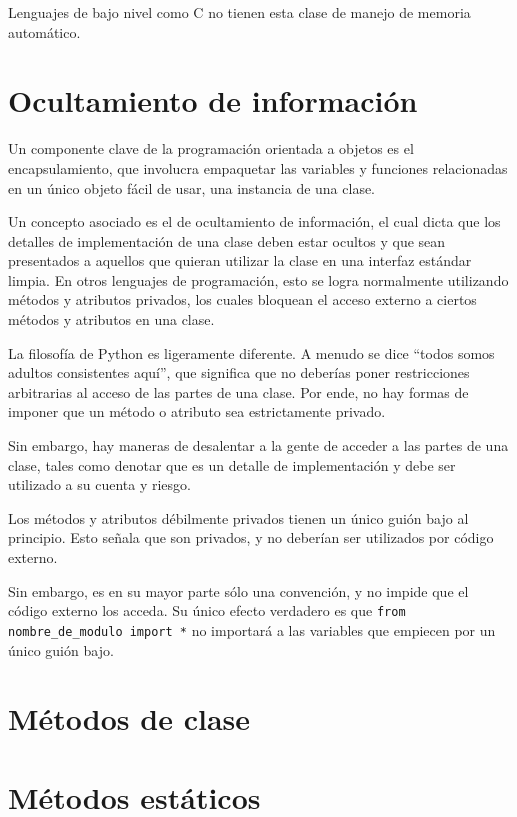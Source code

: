 \documentclass{report}
\newcommand{\doble}[1]{``#1''}
\begin{document}

Lenguajes de bajo nivel como C no tienen esta clase de manejo de memoria automático.

\section{Ocultamiento de información}

Un componente clave de la programación orientada a objetos es el encapsulamiento, que involucra empaquetar las variables y funciones relacionadas en un único objeto fácil de usar, una instancia de una clase.

Un concepto asociado es el de ocultamiento de información, el cual dicta que los detalles de implementación de una clase deben estar ocultos y que sean presentados a aquellos que quieran utilizar la clase en una interfaz estándar limpia. En otros lenguajes de programación, esto se logra normalmente utilizando métodos y atributos privados, los cuales bloquean el acceso externo a ciertos métodos y atributos en una clase.

La filosofía de Python es ligeramente diferente. A menudo se dice \doble{todos somos adultos consistentes aquí}, que significa que no deberías poner restricciones arbitrarias al acceso de las partes de una clase. Por ende, no hay formas de imponer que un método o atributo sea estrictamente privado.

Sin embargo, hay maneras de desalentar a la gente de acceder a las partes de una clase, tales como denotar que es un detalle de implementación y debe ser utilizado a su cuenta y riesgo.

Los métodos y atributos débilmente privados tienen un único guión bajo al principio. Esto señala que son privados, y no deberían ser utilizados por código externo.

Sin embargo, es en su mayor parte sólo una convención, y no impide que el código externo los acceda. Su único efecto verdadero es que \texttt{from nombre_de_modulo import *} no importará a las variables que empiecen por un único guión bajo.

\section{Métodos de clase}

\section{Métodos estáticos}
\end{document}
